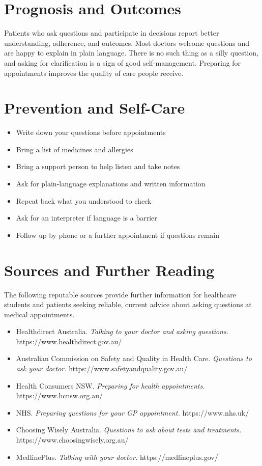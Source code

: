 \section*{Prognosis and Outcomes}
Patients who ask questions and participate in decisions report better understanding, adherence, and outcomes. Most doctors welcome questions and are happy to explain in plain language. There is no such thing as a silly question, and asking for clarification is a sign of good self-management. Preparing for appointments improves the quality of care people receive.

\section*{Prevention and Self-Care}
\begin{itemize}
    \item Write down your questions before appointments
    \item Bring a list of medicines and allergies
    \item Bring a support person to help listen and take notes
    \item Ask for plain-language explanations and written information
    \item Repeat back what you understood to check
    \item Ask for an interpreter if language is a barrier
    \item Follow up by phone or a further appointment if questions remain
\end{itemize}

\section*{Sources and Further Reading}
The following reputable sources provide further information for healthcare students and patients seeking reliable, current advice about asking questions at medical appointments.

\begin{itemize}
    \item Healthdirect Australia. \textit{Talking to your doctor and asking questions.} https://www.healthdirect.gov.au/
    \item Australian Commission on Safety and Quality in Health Care. \textit{Questions to ask your doctor.} https://www.safetyandquality.gov.au/
    \item Health Consumers NSW. \textit{Preparing for health appointments.} https://www.hcnsw.org.au/
    \item NHS. \textit{Preparing questions for your GP appointment.} https://www.nhs.uk/
    \item Choosing Wisely Australia. \textit{Questions to ask about tests and treatments.} https://www.choosingwisely.org.au/
    \item MedlinePlus. \textit{Talking with your doctor.} https://medlineplus.gov/
\end{itemize}
